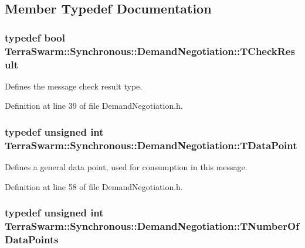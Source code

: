 \subsection{Member Typedef Documentation}
\hypertarget{class_terra_swarm_1_1_synchronous_1_1_demand_negotiation_abf70719cd7b70d3eeecb1949bc2157a3}{
\subsubsection[{T\-Check\-Result}]{\setlength{\rightskip}{0pt plus 5cm}typedef bool {\bf Terra\-Swarm\-::\-Synchronous\-::\-Demand\-Negotiation\-::\-T\-Check\-Result}}}\label{class_terra_swarm_1_1_synchronous_1_1_demand_negotiation_abf70719cd7b70d3eeecb1949bc2157a3}


Defines the message check result type. 



Definition at line 39 of file Demand\-Negotiation.\-h.

\hypertarget{class_terra_swarm_1_1_synchronous_1_1_demand_negotiation_a6660353fa0a65775070bba8571a76e3d}{
\subsubsection[{T\-Data\-Point}]{\setlength{\rightskip}{0pt plus 5cm}typedef unsigned int {\bf Terra\-Swarm\-::\-Synchronous\-::\-Demand\-Negotiation\-::\-T\-Data\-Point}}}\label{class_terra_swarm_1_1_synchronous_1_1_demand_negotiation_a6660353fa0a65775070bba8571a76e3d}


Defines a general data point, used for consumption in this message. 



Definition at line 58 of file Demand\-Negotiation.\-h.

\hypertarget{class_terra_swarm_1_1_synchronous_1_1_demand_negotiation_aeaaae7fc1861d9af2bff4c9dcb4d89ac}{
\subsubsection[{T\-Number\-Of\-Data\-Points}]{\setlength{\rightskip}{0pt plus 5cm}typedef unsigned int {\bf Terra\-Swarm\-::\-Synchronous\-::\-Demand\-Negotiation\-::\-T\-Number\-Of\-Data\-Points}}}\label{class_terra_swarm_1_1_synchronous_1_1_demand_negotiation_aeaaae7fc1861d9af2bff4c9dcb4d89ac}


